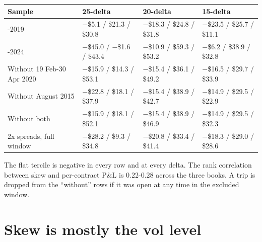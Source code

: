 \documentclass{article}
\begin{document}
\begin{center}\small
\begin{tabularx}{\linewidth}{>{\raggedright\arraybackslash}X >{\raggedright\arraybackslash}X >{\raggedright\arraybackslash}X >{\raggedright\arraybackslash}X}
\toprule
\textbf{Sample} & \textbf{25-delta} & \textbf{20-delta} & \textbf{15-delta} \\
\midrule
2014-2019 & \ensuremath{-}\$5.1 /\allowbreak{} \$21.3 /\allowbreak{} \$30.8 & \ensuremath{-}\$18.3 /\allowbreak{} \$24.8 /\allowbreak{} \$31.8 & \ensuremath{-}\$23.5 /\allowbreak{} \$25.7 /\allowbreak{} \$11.1 \\
2020-2024 & \ensuremath{-}\$45.0 /\allowbreak{} \ensuremath{-}\$1.6 /\allowbreak{} \$43.4 & \ensuremath{-}\$10.9 /\allowbreak{} \$59.3 /\allowbreak{} \$53.2 & \ensuremath{-}\$6.2 /\allowbreak{} \$38.9 /\allowbreak{} \$32.8 \\
Without 19 Feb-30 Apr 2020 & \ensuremath{-}\$15.9 /\allowbreak{} \$14.3 /\allowbreak{} \$53.1 & \ensuremath{-}\$15.4 /\allowbreak{} \$36.1 /\allowbreak{} \$49.2 & \ensuremath{-}\$16.5 /\allowbreak{} \$29.7 /\allowbreak{} \$33.9 \\
Without August 2015 & \ensuremath{-}\$22.8 /\allowbreak{} \$18.1 /\allowbreak{} \$37.9 & \ensuremath{-}\$15.4 /\allowbreak{} \$38.9 /\allowbreak{} \$42.7 & \ensuremath{-}\$14.9 /\allowbreak{} \$29.5 /\allowbreak{} \$22.9 \\
Without both & \ensuremath{-}\$15.9 /\allowbreak{} \$18.1 /\allowbreak{} \$52.1 & \ensuremath{-}\$15.4 /\allowbreak{} \$38.9 /\allowbreak{} \$46.9 & \ensuremath{-}\$14.9 /\allowbreak{} \$29.5 /\allowbreak{} \$32.3 \\
2x spreads, full window & \ensuremath{-}\$28.2 /\allowbreak{} \$9.3 /\allowbreak{} \$34.8 & \ensuremath{-}\$20.8 /\allowbreak{} \$33.4 /\allowbreak{} \$41.4 & \ensuremath{-}\$18.3 /\allowbreak{} \$29.0 /\allowbreak{} \$28.6 \\
\bottomrule
\end{tabularx}
\end{center}

The flat tercile is negative in every row and at every delta. The rank correlation between skew and per-contract P\&L is 0.22-0.28 across the three books. A trip is dropped from the ``without'' rows if it was open at any time in the excluded window.

\section{Skew is mostly the vol level}
\end{document}
